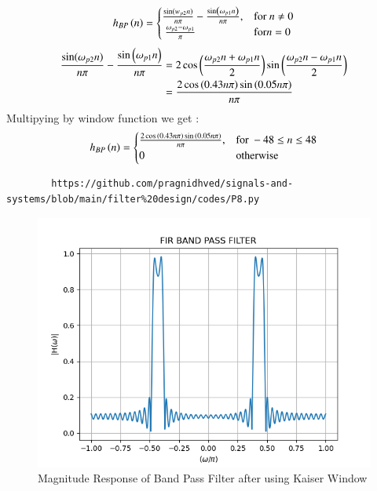 \documentclass{article}
\begin{document}
	\begin{align}
		h_{BP}\left(n\right) = 
		\begin{cases} 
			\frac{\sin(w_{p2} n)}{n\pi} -\frac{\sin\left(\omega_{p1}n\right)}{n\pi},  & \text{for } n\neq 0\\\
			\frac{\omega_{p2}-\omega_{p1}}{\pi} &\text{for} n= 0
		\end{cases} \label{eq:h(n)desired_for_LPF}
	\end{align}
	\begin{align}
		\frac{\sin(\omega_{p2} n)}{n\pi} -\frac{\sin\left(\omega_{p1}n\right)}{n\pi} &= 2\cos{\ensuremath{\left(\frac{\omega_{p2}n+\omega_{p1}n}{2}\right)}}\sin{\ensuremath{\left(\frac{\omega_{p2}n-\omega_{p1}n}{2}\right)}}\\
		&= \frac{2\cos{\ensuremath{\left(0.43n\pi\right)}}\sin{\ensuremath{\left(0.05n\pi\right)}}}{n\pi}
	\end{align}
	Multipying by window function we get :
	\begin{align}
		h_{BP}\left(n\right) = 
		\begin{cases} 
			\frac{2\cos{\ensuremath{\left(0.43n\pi\right)}}\sin{\ensuremath{\left(0.05n\pi\right)}}}{n\pi},  & \text{for } -48\leq n \leq 48 \\
			0 &\text{otherwise}
		\end{cases} \label{eq:h(n)desired_for_LPF}
	\end{align}
	\begin{lstlisting}
		https://github.com/pragnidhved/signals-and-systems/blob/main/filter%20design/codes/P8.py
	\end{lstlisting}
	\begin{figure}[htbp]
		\centering
		\includegraphics[width=1\linewidth]{figs/fig8}
		\caption{Magnitude Response of Band Pass Filter after using Kaiser Window}
		\label{fig:Kaiser_BPF_response}
	\end{figure}
\end{document}
